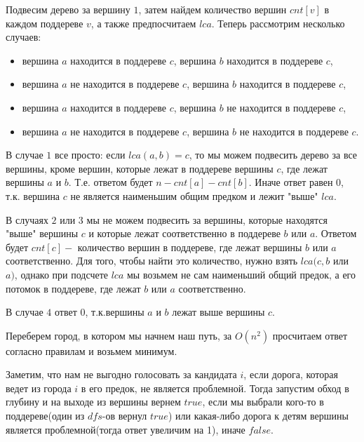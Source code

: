 \documentclass[12pt]{article}
\begin{document}

Подвесим дерево за вершину $1$, затем найдем количество вершин $cnt[v]$ в каждом поддереве $v$, а также предпосчитаем $lca$.
Теперь рассмотрим несколько случаев:
\begin{itemize}
	\item вершина $a$ находится в поддереве $c$, вершина $b$ находится в поддереве $c$,
	\item вершина $a$ не находится в поддереве $c$, вершина $b$ находится в поддереве $c$,
	\item вершина $a$ находится в поддереве $c$, вершина $b$ не находится в поддереве $c$,
	\item вершина $a$ не находится в поддереве $c$, вершина $b$ не находится в поддереве $c$.
\end{itemize}

В случае $1$ все просто: если $lca(a, b) = c$, то мы можем подвесить дерево за все
вершины, кроме вершин, которые лежат в поддереве вершины $c$, где лежат вершины $a$ и $b$.
Т.е. ответом будет $n - cnt[a] - cnt[b]$.
Иначе ответ равен $0$, т.к. вершина $c$ не является наименьшим общим предком и лежит "выше" $lca$.

В случаях $2$ или $3$ мы не можем подвесить за вершины, которые находятся "выше" вершины $c$ и которые лежат соответственно в поддереве $b$ или $a$.
Ответом будет $cnt[c] -$ количество вершин в поддереве, где лежат вершины $b$ или $a$ соответственно. Для того, чтобы найти это количество, нужно
взять $lca(c, b$ или $a)$, однако при подсчете $lca$ мы возьмем не сам наименьший общий предок, а его потомок в поддереве, где лежат $b$ или $a$ соответственно.

В случае $4$ ответ $0$, т.к.вершины $a$ и $b$ лежат выше вершины $c$.

\EndEditorial
{}

Переберем город, в котором мы начнем наш путь, за $O(n^2)$ просчитаем ответ согласно правилам и возьмем минимум.
\EndEditorial
{}

Заметим, что нам не выгодно голосовать за кандидата $i$, если дорога, которая ведет из города $i$ в его предок, не является проблемной.
Тогда запустим обход в глубину и на выходе из вершины вернем $true$, если мы выбрали кого-то в поддереве(один из $dfs$-ов вернул $true$) или какая-либо дорога к детям
вершины является проблемной(тогда ответ увеличим на 1), иначе $false$.

\EndEditorial
\end{document}
